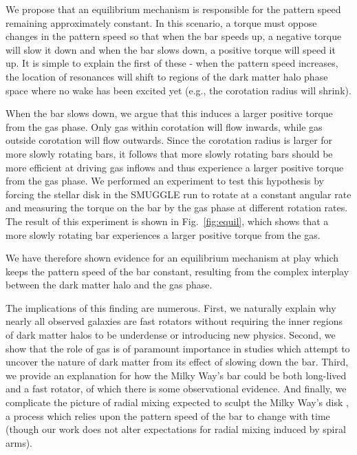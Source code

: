 \documentclass{natureprintstyle}
\begin{document}
We propose that an equilibrium mechanism is responsible for the pattern speed
remaining approximately constant. In this scenario, a torque must oppose
changes in the pattern speed so that when the bar speeds up, a negative torque
will slow it down and when the bar slows down, a positive torque will speed it
up. It is simple to explain the first of these - when the pattern speed
increases, the location of resonances will shift to regions of the dark matter
halo phase space where no wake has been excited yet (e.g., the corotation
radius will shrink).

When the bar slows down, we argue that this induces a larger positive torque
from the gas phase. Only gas within corotation will flow inwards, while gas
outside corotation will flow outwards.\cite{2011MNRAS.415.1027H} Since the
corotation radius is larger for more slowly rotating bars, it follows that
more slowly rotating bars should be more efficient at driving gas inflows and
thus experience a larger positive torque from the gas phase. We performed an
experiment to test this hypothesis by forcing the stellar disk in the SMUGGLE
run to rotate at a constant angular rate and measuring the torque on the bar
by the gas phase at different rotation rates. The result of this experiment is
shown in Fig.~\ref{fig:equil}, which shows that a more slowly rotating bar
experiences a larger positive torque from the gas.

We have therefore shown evidence for an equilibrium mechanism at play which
keeps the pattern speed of the bar constant, resulting from the complex
interplay between the dark matter halo and the gas phase.

The implications of this finding are numerous. First, we naturally explain why
nearly all observed galaxies are fast rotators without requiring the inner
regions of dark matter halos to be underdense\cite{1998ApJ...493L...5D,
2000ApJ...543..704D} or introducing new physics.\cite{2021MNRAS.503.2833R,
2021MNRAS.508..926R} Second, we show that the role of gas is of paramount
importance in studies which attempt to uncover the nature of dark matter from
its effect of slowing down the bar.\cite{2021MNRAS.500.4710C,
2021MNRAS.505.2412C} Third, we provide an explanation for how the Milky Way's
bar could be both long-lived and a fast rotator, of which there is some
observational evidence.\cite{2019MNRAS.490.4740B} And finally, we complicate
the picture of radial mixing expected to sculpt the Milky Way's disk
\cite{2012MNRAS.420..913B, 2015ApJ...808..132H}, a process which relies upon
the pattern speed of the bar to change with time (though our work does not
alter expectations for radial mixing induced by spiral arms\cite{2002MNRAS.336..785S}).
\end{document}
